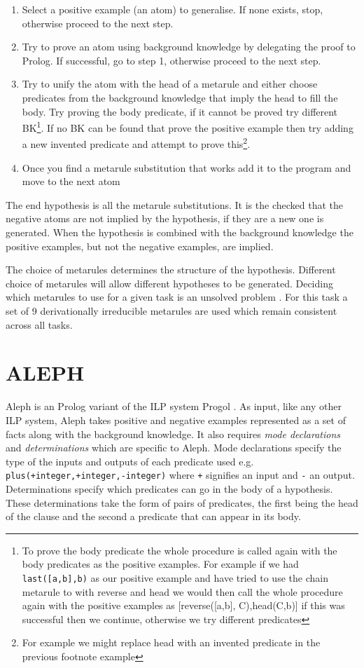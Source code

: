 \documentclass[a4paper,10pt]{report}
\begin{document}
\cite{Andrew/ILP-review}\cite{Rolf/Metagol}\cite{Metagol/Github}
\begin{enumerate}
\item Select a positive example (an atom) to generalise. If none exists, stop, otherwise proceed to the next step.
\item Try to prove an atom using background knowledge by delegating the proof to Prolog. If successful, go to step 1, otherwise proceed to the next step.
\item Try to unify the atom with the head of a metarule and either choose predicates from the background knowledge that imply the head to fill the body. Try proving the body predicate, if it cannot be proved try different BK\footnote{To prove the body predicate the whole procedure is called again with the body predicates as the positive examples. For example if we had \texttt{last([a,b],b)} as our positive example and have tried to use the chain metarule to with reverse and head we would then call the whole procedure again with the positive examples as [reverse([a,b], C),head(C,b)] if this was successful then we continue, otherwise we try different predicates}. If no BK can be found that prove the positive example then try adding a new invented predicate and attempt to prove this\footnote{For example we might replace head with an invented predicate in the previous footnote example}.
\item Once you find a metarule substitution that works add it to the program and move to the next atom
\end{enumerate}


The end hypothesis is all the metarule substitutions. It is the checked that the negative atoms are not implied by the hypothesis, if they are a new one is generated. When the hypothesis is combined with the background knowledge the positive examples, but not the negative examples, are implied.

The choice of metarules determines the structure of the hypothesis. Different choice of metarules will allow different hypotheses to be generated. Deciding which metarules to use for a given task is an unsolved problem \cite{Cropper/Thesis}. For this task a set of 9 derivationally irreducible metarules are used which remain consistent across all tasks.
\section{ALEPH}
Aleph is an Prolog variant of the ILP system Progol \cite{Muggleton/Aleph}. As input, like any other ILP system, Aleph takes positive and negative examples represented as a set of facts along with the background knowledge. It also requires \textit{mode declarations} and \textit{determinations} which are specific to Aleph. Mode declarations specify the type of the inputs and outputs of each predicate used e.g. \texttt{plus(+integer,+integer,-integer)} where \texttt{+} signifies an input and \texttt{-} an output.
Determinations specify which predicates can go in the body of a hypothesis. These determinations take the form of pairs of predicates, the first being the head of the clause and the second a predicate that can appear in its body.
\end{document}
